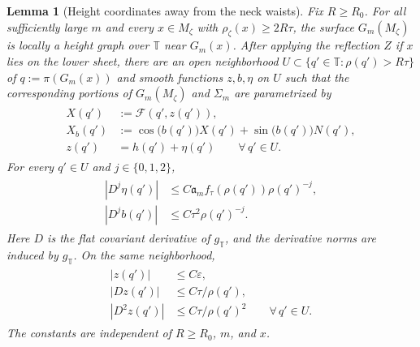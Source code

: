 \documentclass[a4paper,11pt,oneside,reqno]{amsart}
\numberwithin{equation}{section}
\newtheorem{lemma}[theorem]{Lemma}
\theoremstyle{definition}
\begin{document}
\begin{lemma}[Height coordinates away from the neck waists]
    \label{lem:s4-outer-coordinates}
    Fix $R\geq R_0$. For all sufficiently large $m$ and every
    $x\in M_\zeta$ with $\rho_\zeta(x)\geq2R\tau$, the surface
    $G_m(M_\zeta)$ is locally a height graph over $\mathbb T$
    near $G_m(x)$.
    After applying the reflection $Z$ if $x$ lies on the
    lower sheet, there are an open neighborhood
    $U\subset\{q'\in\mathbb T:\rho(q')>R\tau\}$ of
    $q:=\pi(G_m(x))$ and smooth functions $z,b,\eta$ on $U$
    such that the corresponding portions of
    $G_m(M_\zeta)$ and $\Sigma_m$ are parametrized by
    \begin{align}
        \label{eq:s4-outer-graph-form}
        \begin{split}
            X(q')&:=\mathcal F(q',z(q')),\\
            X_b(q')&:=\cos\bigl(b(q')\bigr)X(q')
                        +\sin\bigl(b(q')\bigr)N(q'),\\
            z(q')&=h(q')+\eta(q')
            \qquad\forall\,q'\in U.
        \end{split}
    \end{align}
    For every $q'\in U$ and $j\in\{0,1,2\}$,
    \begin{align}
        \label{eq:s4-outer-coordinate-estimates}
        \begin{split}
            |D^j\eta(q')|
            &\leq C\mathfrak a_m f_\tau(\rho(q'))\rho(q')^{-j},\\
            |D^jb(q')|&\leq C\tau^2\rho(q')^{-j}.
        \end{split}
    \end{align}
    Here $D$ is the flat covariant derivative of
    $g_{\mathbb T}$, and the derivative norms are induced
    by $g_{\mathbb T}$. On the same neighborhood,
    \begin{align}
        \label{eq:s4-outer-height-bounds}
        \begin{split}
            |z(q')|&\leq C\varepsilon,\\
            |Dz(q')|&\leq C\tau/\rho(q'),\\
            |D^2z(q')|&\leq C\tau/\rho(q')^2
            \qquad\forall\,q'\in U.
        \end{split}
    \end{align}
    The constants are independent of $R\geq R_0$, $m$, and $x$.
\end{lemma}
\end{document}

